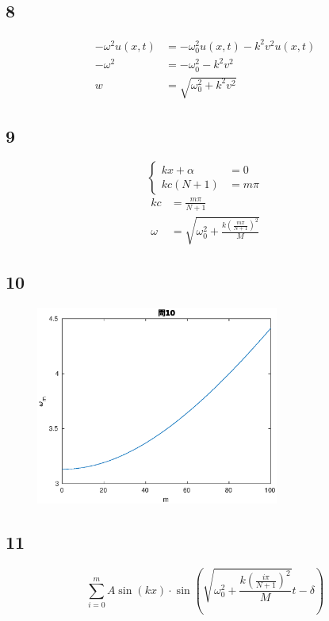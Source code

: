 \documentclass{jreport}
\begin{document}
\subsection{8}
\begin{equation}
	\begin{aligned}
		-\omega^2 u(x,t) &= -\omega_0^2 u(x,t) - k^2 v^2 u(x,t)\\
		-\omega^2 &= -\omega_0^2 -k^2 v^2\\
		w&= \sqrt{\omega_0^2 + k^2v^2}
	\end{aligned}
\end{equation}
\subsection{9}
\begin{equation}
	\left\{
	\begin{aligned}
		kx + \alpha &=0 \\
		kc(N+1) &= m \pi 
	\end{aligned}
	\right.
\end{equation}
\begin{equation}
	\begin{aligned}
		kc &=\frac{m \pi}{N+1} \\
		\omega &= \sqrt{\omega_0^2 +\frac{k(\frac{m \pi}{N+1})^2}{M}}
	\end{aligned}
\end{equation}
\subsection{10}
\begin{figure}[H]
	\centering
	\includegraphics[width=8cm]{10.eps}
\end{figure}
\subsection{11}
\begin{equation}
	\sum_{i=0}^m A \sin (kx) \cdot \sin \left( \sqrt{\omega_0^2 +\frac{k(\frac{i\pi}{N+1})^2}{M}} t -\delta \right)
\end{equation}
\newpage
\end{document}
